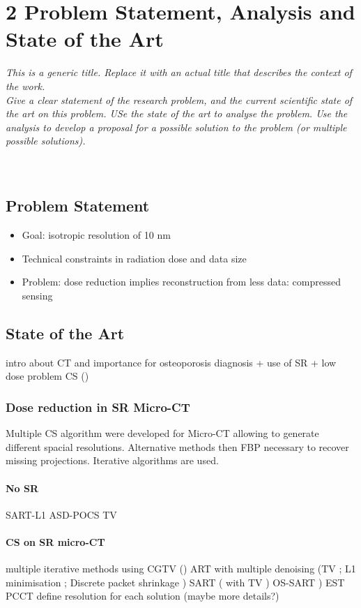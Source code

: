 \chapter{2	Problem Statement, Analysis and State of the Art}
\textit{This is a generic title. Replace it with an actual title that describes the context of the work. \\
Give a clear statement of the research problem, and the current scientific state of the art on this problem.  USe the state of the art to analyse the problem.  Use the analysis to develop a proposal for a possible solution to the problem (or multiple possible solutions).}\\
\\
\\
\section{Problem Statement}
\begin{itemize}
	\item 	Goal: isotropic resolution of 10 nm
	\item 	Technical constraints in radiation dose and data size
	\item 	Problem: dose reduction implies reconstruction from less data: compressed sensing
\end{itemize}

\section{State of the Art}


	intro about CT and importance for osteoporosis diagnosis + use of SR + low dose problem CS (\cite{[24], [25], [26]})

\subsection{Dose reduction in SR Micro-CT}
Multiple CS algorithm were developed for Micro-CT allowing to generate different spacial resolutions. Alternative methods then FBP necessary to recover missing projections. Iterative algorithms are used.
	\subsubsection{No SR}
		SART-L1 \cite{[11],[13]} ASD-POCS TV \cite{[9]}
	\subsubsection{CS on SR micro-CT}
		multiple iterative methods using CGTV (\cite{[12]}) ART with multiple denoising (TV \cite{[3]}; L1 minimisation \cite{[18]}; Discrete packet shrinkage \cite{[2]}) SART (\cite{[1]} with TV \cite{[5]}) OS-SART \cite{[6]}) EST \cite{[15], [16]}  PCCT \cite{[8]}
		 define resolution for each solution (maybe more details?)

